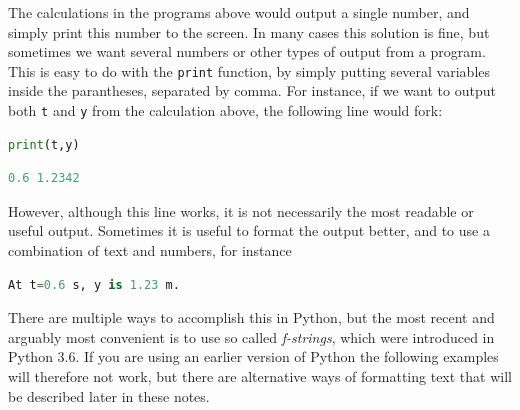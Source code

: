 \documentclass[graybox,envcountchap,sectrefs,final]{svmonodo}
\begin{document}
The calculations in the programs above would output a single number, and simply print this number to the screen.
In many cases this solution is fine, but sometimes we want
several numbers or other types of output from a program. This is easy to do with the \texttt{print} function, by simply
putting several variables inside the parantheses, separated by comma. For instance, if we want to output both
\texttt{t} and \texttt{y} from the calculation above, the following line would fork:
\begin{lstlisting}[language=Python,style=blue1]
print(t,y)
\end{lstlisting}
\begin{lstlisting}[language=Python,style=gray]
0.6 1.2342
\end{lstlisting}
However, although this line works, it is not necessarily the most readable or useful output. Sometimes it is useful to
format the output better, and to use a combination of text and numbers, for instance
\begin{lstlisting}[language=Python,style=gray]
At t=0.6 s, y is 1.23 m.
\end{lstlisting}
There are multiple ways to accomplish this in Python, but the most recent and arguably most convenient is to use so
called \emph{f-strings}, which were introduced in Python 3.6. If you are using an earlier version of Python the following examples
will therefore not work, but there are alternative ways of formatting text that will be described later in these notes.
\end{document}
